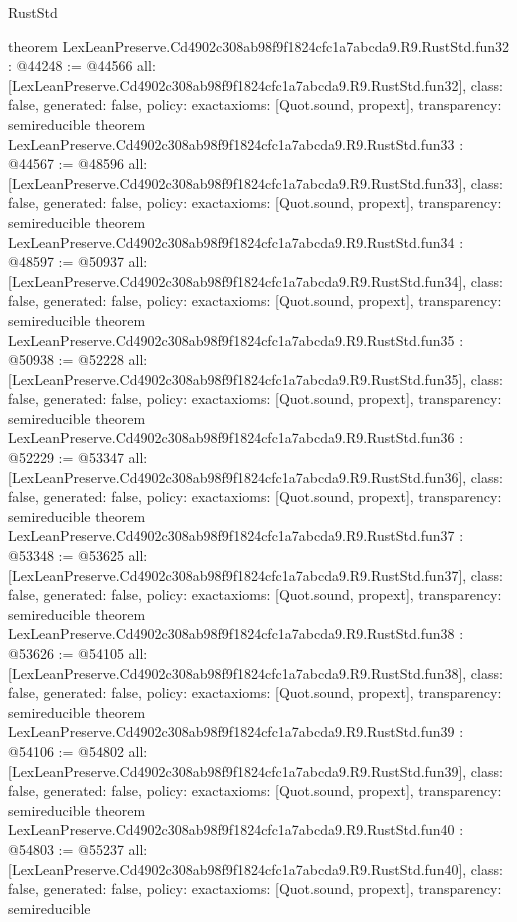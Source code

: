 \begin{lexlean}{RustStd}
\begin{coremodule}
{}
theorem LexLeanPreserve.Cd4902c308ab98f9f1824cfc1a7abcda9.R9.RustStd.fun32 : @44248 := @44566 {
  all: [LexLeanPreserve.Cd4902c308ab98f9f1824cfc1a7abcda9.R9.RustStd.fun32],
  class: false,
  generated: false,
  policy: exact{axioms: [Quot.sound, propext]},
  transparency: semireducible
}
theorem LexLeanPreserve.Cd4902c308ab98f9f1824cfc1a7abcda9.R9.RustStd.fun33 : @44567 := @48596 {
  all: [LexLeanPreserve.Cd4902c308ab98f9f1824cfc1a7abcda9.R9.RustStd.fun33],
  class: false,
  generated: false,
  policy: exact{axioms: [Quot.sound, propext]},
  transparency: semireducible
}
theorem LexLeanPreserve.Cd4902c308ab98f9f1824cfc1a7abcda9.R9.RustStd.fun34 : @48597 := @50937 {
  all: [LexLeanPreserve.Cd4902c308ab98f9f1824cfc1a7abcda9.R9.RustStd.fun34],
  class: false,
  generated: false,
  policy: exact{axioms: [Quot.sound, propext]},
  transparency: semireducible
}
theorem LexLeanPreserve.Cd4902c308ab98f9f1824cfc1a7abcda9.R9.RustStd.fun35 : @50938 := @52228 {
  all: [LexLeanPreserve.Cd4902c308ab98f9f1824cfc1a7abcda9.R9.RustStd.fun35],
  class: false,
  generated: false,
  policy: exact{axioms: [Quot.sound, propext]},
  transparency: semireducible
}
theorem LexLeanPreserve.Cd4902c308ab98f9f1824cfc1a7abcda9.R9.RustStd.fun36 : @52229 := @53347 {
  all: [LexLeanPreserve.Cd4902c308ab98f9f1824cfc1a7abcda9.R9.RustStd.fun36],
  class: false,
  generated: false,
  policy: exact{axioms: [Quot.sound, propext]},
  transparency: semireducible
}
theorem LexLeanPreserve.Cd4902c308ab98f9f1824cfc1a7abcda9.R9.RustStd.fun37 : @53348 := @53625 {
  all: [LexLeanPreserve.Cd4902c308ab98f9f1824cfc1a7abcda9.R9.RustStd.fun37],
  class: false,
  generated: false,
  policy: exact{axioms: [Quot.sound, propext]},
  transparency: semireducible
}
theorem LexLeanPreserve.Cd4902c308ab98f9f1824cfc1a7abcda9.R9.RustStd.fun38 : @53626 := @54105 {
  all: [LexLeanPreserve.Cd4902c308ab98f9f1824cfc1a7abcda9.R9.RustStd.fun38],
  class: false,
  generated: false,
  policy: exact{axioms: [Quot.sound, propext]},
  transparency: semireducible
}
theorem LexLeanPreserve.Cd4902c308ab98f9f1824cfc1a7abcda9.R9.RustStd.fun39 : @54106 := @54802 {
  all: [LexLeanPreserve.Cd4902c308ab98f9f1824cfc1a7abcda9.R9.RustStd.fun39],
  class: false,
  generated: false,
  policy: exact{axioms: [Quot.sound, propext]},
  transparency: semireducible
}
theorem LexLeanPreserve.Cd4902c308ab98f9f1824cfc1a7abcda9.R9.RustStd.fun40 : @54803 := @55237 {
  all: [LexLeanPreserve.Cd4902c308ab98f9f1824cfc1a7abcda9.R9.RustStd.fun40],
  class: false,
  generated: false,
  policy: exact{axioms: [Quot.sound, propext]},
  transparency: semireducible
}
\end{coremodule}
\end{lexlean}
